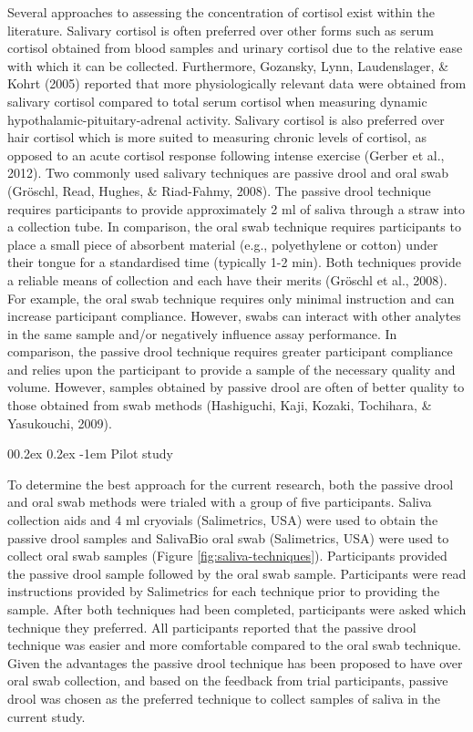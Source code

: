 \documentclass[
  english,
  man,floatsintext]{apa6}
\makeatletter
\renewcommand{\paragraph}{\@startsection{paragraph}{4}{\parindent}%
  {0\baselineskip \@plus 0.2ex \@minus 0.2ex}%
  {-1em}%
  {\normalfont\normalsize\bfseries\itshape\typesectitle}}
\makeatother
\begin{document}
Several approaches to assessing the concentration of cortisol exist within the literature.
Salivary cortisol is often preferred over other forms such as serum cortisol obtained from blood samples and urinary cortisol due to the relative ease with which it can be collected. Furthermore, Gozansky, Lynn, Laudenslager, \& Kohrt (2005) reported that more physiologically relevant data were obtained from salivary cortisol compared to total serum cortisol when measuring dynamic hypothalamic-pituitary-adrenal activity.
Salivary cortisol is also preferred over hair cortisol which is more suited to measuring chronic levels of cortisol, as opposed to an acute cortisol response following intense exercise (Gerber et al., 2012).
Two commonly used salivary techniques are passive drool and oral swab (Gröschl, Read, Hughes, \& Riad-Fahmy, 2008).
The passive drool technique requires participants to provide approximately 2 ml of saliva through a straw into a collection tube.
In comparison, the oral swab technique requires participants to place a small piece of absorbent material (e.g., polyethylene or cotton) under their tongue for a standardised time (typically 1-2 min).
Both techniques provide a reliable means of collection and each have their merits (Gröschl et al., 2008).
For example, the oral swab technique requires only minimal instruction and can increase participant compliance.
However, swabs can interact with other analytes in the same sample and/or negatively influence assay performance.
In comparison, the passive drool technique requires greater participant compliance and relies upon the participant to provide a sample of the necessary quality and volume.
However, samples obtained by passive drool are often of better quality to those obtained from swab methods (Hashiguchi, Kaji, Kozaki, Tochihara, \& Yasukouchi, 2009).

\hypertarget{pilot-study-2}{%
\paragraph{Pilot study}\label{pilot-study-2}}

To determine the best approach for the current research, both the passive drool and oral swab methods were trialed with a group of five participants.
Saliva collection aids and 4 ml cryovials (Salimetrics, USA) were used to obtain the passive drool samples and SalivaBio oral swab (Salimetrics, USA) were used to collect oral swab samples (Figure \ref{fig:saliva-techniques}).
Participants provided the passive drool sample followed by the oral swab sample.
Participants were read instructions provided by Salimetrics for each technique prior to providing the sample.
After both techniques had been completed, participants were asked which technique they preferred.
All participants reported that the passive drool technique was easier and more comfortable compared to the oral swab technique.
Given the advantages the passive drool technique has been proposed to have over oral swab collection, and based on the feedback from trial participants, passive drool was chosen as the preferred technique to collect samples of saliva in the current study.
\end{document}
